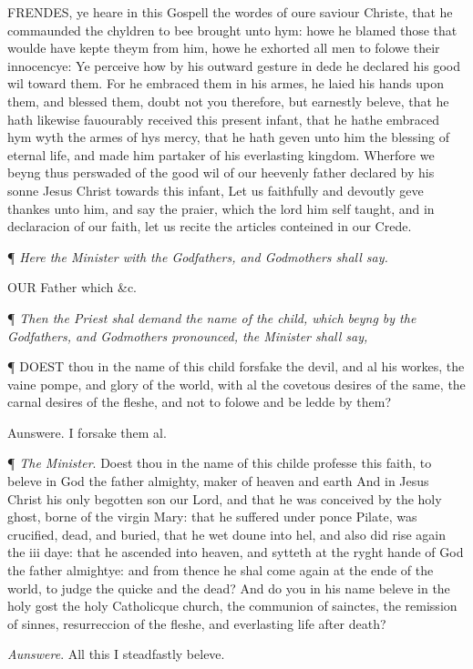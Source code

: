 FRENDES,
ye heare in this Gospell the wordes of oure saviour Christe, that he commaunded
the chyldren to bee brought unto hym: howe he blamed those that woulde
have kepte theym from him, howe he exhorted all men to folowe their innocencye:
Ye perceive how by his outward gesture in dede he declared his good wil
toward them. For he embraced them in his armes, he laied his hands upon
them, and blessed them, doubt not you therefore, but earnestly beleve,
that he hath likewise fauourably received this present infant, that he
hathe embraced hym wyth the armes of hys mercy, that he hath geven unto
him the blessing of eternal life, and made him partaker of his everlasting
kingdom. Wherfore we beyng thus perswaded of the good wil of our heevenly
father declared by his sonne Jesus Christ towards this infant, Let us
faithfully and devoutly geve thankes unto him, and say the praier, which
the lord him self taught, and in declaracion of our faith, let us recite
the articles conteined in our Crede.

¶
\emph{Here the Minister with the Godfathers, and Godmothers shall say.}

OUR
Father which \&c.

¶ \emph{Then
the Priest shal demand the name of the child, which beyng by the Godfathers,
and Godmothers pronounced, the Minister shall say,}

¶
DOEST
thou in the name of this child forsfake the devil, and al his workes,
the vaine pompe, and glory of the world, with al the covetous desires
of the same, the carnal desires of the fleshe, and not to folowe and be
ledde by them? 

Aunswere. I forsake them al.

¶ \emph{The Minister}. Doest thou in the name of this childe professe
this faith, to beleve in God the father almighty, maker of heaven and
earth And in Jesus Christ his only begotten son our Lord, and that he
was conceived by the holy ghost, borne of the virgin Mary: that he suffered
under ponce Pilate, was crucified, dead, and buried, that he wet doune
into hel, and also did rise again the iii daye: that he ascended into
heaven, and sytteth at the ryght hande of God the father almightye: and
from thence he shal come again at the ende of the world, to judge the
quicke and the dead? And do you in his name beleve in the holy gost the
holy Catholicque church, the communion of sainctes, the remission of sinnes,
resurreccion of the fleshe, and everlasting life after death?

\emph{Aunswere}. All this I steadfastly beleve.

